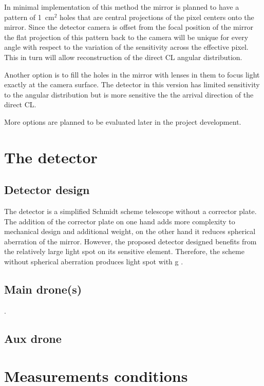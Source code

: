 \documentclass[a4paper,11pt]{article}
\begin{document}
In minimal implementation of this method the mirror is planned to have a pattern of 1~cm$^2$ holes that are central projections of the pixel centers onto the mirror. Since the detector camera is offset from the focal position of the mirror the flat projection of this pattern back to the camera will be unique for every angle with respect to the variation of the sensitivity across the effective pixel. This in turn will allow reconstruction of the direct CL angular distribution.

Another option is to fill the holes in the mirror with lenses in them to focus light exactly at the camera surface. The detector in this version has limited sensitivity to the angular distribution but is more sensitive the the arrival direction of the direct CL.

More options are planned to be evaluated later in the project development.

\section{The detector}
\subsection{Detector design}
The detector is a simplified Schmidt scheme telescope without a corrector plate. The addition of the corrector plate on one hand adds more complexity to mechanical design and additional weight, on the other hand it reduces spherical aberration of the mirror. However, the proposed detector designed benefits from the relatively large light spot on its sensitive element. Therefore, the scheme without 
spherical aberration produces light spot with g
.
\subsection{Main drone(s)}
.
\subsection{Aux drone}

\section{Measurements conditions}
\end{document}

